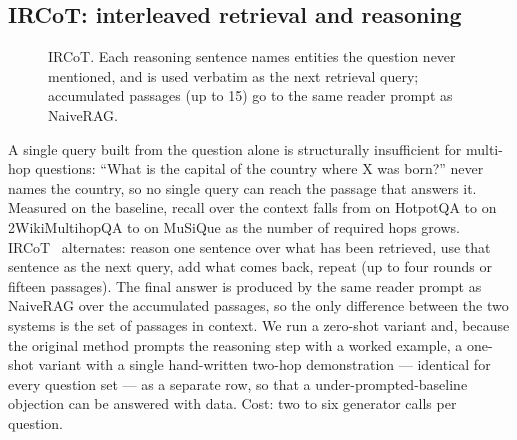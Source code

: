 \subsection{IRCoT: interleaved retrieval and reasoning}
\label{sec:arch-ircot}

\begin{figure}[t]
\centering
{}
\caption{IRCoT. Each reasoning sentence names entities the question never
mentioned, and is used verbatim as the next retrieval query; accumulated
passages (up to 15) go to the same reader prompt as NaiveRAG.}
\label{fig:arch-ircot}
\end{figure}

A single query built from the question alone is structurally insufficient
for multi-hop questions: ``What is the capital of the country where X was
born?'' never names the country, so no single query can reach the passage
that answers it. Measured on the baseline, recall over the context falls
from \NaiveRAGHotpotQARecallInContext{} on HotpotQA to
\NaiveRAGTwoWikiRecallInContext{} on 2WikiMultihopQA to
\NaiveRAGMuSiQueRecallInContext{} on MuSiQue as the number of required hops
grows. IRCoT~\cite{trivedi2023ircot} alternates: reason one sentence over
what has been retrieved, use that sentence as the next query, add what
comes back, repeat (up to four rounds or fifteen passages). The final
answer is produced by the same reader prompt as NaiveRAG over the
accumulated passages, so the only difference between the two systems is
the set of passages in context. We run a zero-shot variant and, because
the original method prompts the reasoning step with a worked example, a
one-shot variant with a single hand-written two-hop demonstration ---
identical for every question set --- as a separate row, so that a
under-prompted-baseline objection can be answered with data. Cost: two to
six generator calls per question.


